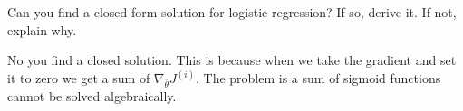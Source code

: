 \documentclass[12pt, letterpaper]{article}
\begin{document}
\begin{subproblem}{}
    Can you find a closed form solution for logistic regression? If so, derive it. If not, explain why.
\end{subproblem}
\begin{solution}
    No you find a closed solution. This is because when we take the gradient and set it to zero we get a sum of 
    $\nabla_{\bar{\theta}} J^{(i)}$. The problem is a sum of sigmoid functions cannot be solved algebraically.
\end{solution}
\end{document}
